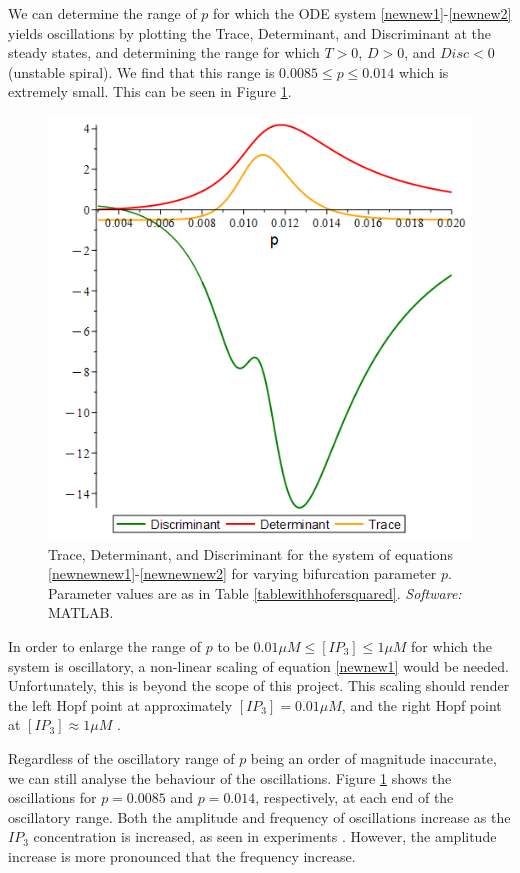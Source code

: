 We can determine the range of $p$ for which the ODE system \eqref{newnew1}-\eqref{newnew2} yields oscillations by plotting the Trace, Determinant, and Discriminant at the steady states, and determining the range for which $T>0$, $D>0$, and $Disc<0$ (unstable spiral). We find that this range is $0.0085 \leq p \leq 0.014$ which is extremely small. This can be seen in Figure \ref{tdd}. 

\begin{figure}[!htb]
\centering
\includegraphics[width=0.7\linewidth]{Chapters/5_New_Model/extras/mapletdd.png}
\caption{{Trace, Determinant, and Discriminant for the system of equations \eqref{newnewnew1}-\eqref{newnewnew2} for varying bifurcation parameter $p$. Parameter values are as in Table \ref{tablewithhofersquared}.} \textit{Software:} MATLAB.}\label{tdd}
\end{figure}

In order to enlarge the range of $p$ to be $0.01 \mu M \leq [IP_3] \leq 1 \mu M$ for which the system is oscillatory, a non-linear scaling of equation \eqref{newnew1} would be needed. Unfortunately, this is beyond the scope of this project.  This scaling should render the left Hopf point at approximately $[IP_3]=0.01 \mu M$, and the right Hopf point at $[IP_3] \approx 1 \mu M$ \cite{karl}.

Regardless of the oscillatory range of $p$ being an order of magnitude inaccurate, we can still analyse the behaviour of the oscillations. Figure \ref{tdd} shows the oscillations for $p=0.0085$ and $p=0.014$, respectively, at each end of the oscillatory range. Both the amplitude and frequency of oscillations increase as the $IP_3$ concentration is increased, as seen in experiments \cite{Sanders2018}. However, the amplitude increase is more pronounced that the frequency increase.

